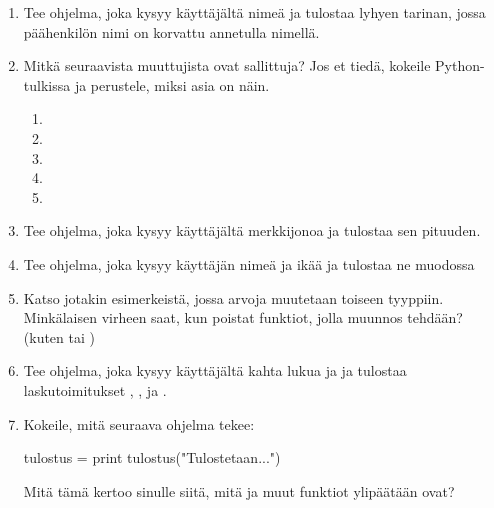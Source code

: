 \begin{enumerate}[\thesection .1]

\item Tee ohjelma, joka kysyy käyttäjältä nimeä ja tulostaa lyhyen tarinan, jossa päähenkilön nimi on korvattu annetulla nimellä.

\item Mitkä seuraavista muuttujista ovat sallittuja? Jos et tiedä, kokeile Python-tulkissa ja perustele, miksi asia on näin.

\begin{enumerate}
\item {}
\item {}
\item {}
\item {}
\item {}
\end{enumerate}

\item Tee ohjelma, joka kysyy käyttäjältä merkkijonoa ja tulostaa sen pituuden.

\item Tee ohjelma, joka kysyy käyttäjän nimeä ja ikää ja tulostaa ne muodossa 

\item Katso jotakin esimerkeistä, jossa arvoja muutetaan toiseen tyyppiin. Minkälaisen virheen saat, kun poistat funktiot, jolla muunnos tehdään? (kuten  tai )

\item Tee ohjelma, joka kysyy käyttäjältä kahta lukua  ja  ja tulostaa laskutoimitukset , ,  ja .

\item Kokeile, mitä seuraava ohjelma tekee:

\begin{python}
tulostus = print
tulostus("Tulostetaan...")
\end{python}

Mitä tämä kertoo sinulle siitä, mitä  ja muut funktiot ylipäätään ovat?

\end{enumerate}
